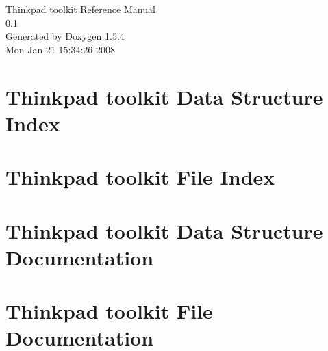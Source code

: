\documentclass[a4paper]{book}
\begin{document}
\begin{titlepage}
\vspace*{7cm}
\begin{center}
{\Large Thinkpad toolkit Reference Manual\\[1ex]\large 0.1 }\\
\vspace*{1cm}
{\large Generated by Doxygen 1.5.4}\\
\vspace*{0.5cm}
{\small Mon Jan 21 15:34:26 2008}\\
\end{center}
\end{titlepage}
\clearemptydoublepage
{}
\tableofcontents
\clearemptydoublepage
{}
\chapter{Thinkpad toolkit Data Structure Index}

\chapter{Thinkpad toolkit File Index}

\chapter{Thinkpad toolkit Data Structure Documentation}

\chapter{Thinkpad toolkit File Documentation}



\printindex
\end{document}
